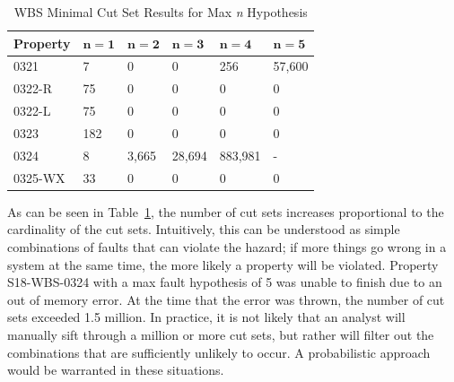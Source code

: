 \begin{table}[htbp]
\begin{center}
    \begin{tabular}{ | l | l | l | l | l | l |}
    \hline
    \textbf{Property} & $\bm{n = 1}$ & $\bm{n = 2}$ & $\bm{n = 3}$ & $\bm{n = 4}$ 
		& $\bm{n = 5}$    \\ \hline \hline
    0321 & 7 & 0 & 0 & 256 & 57,600   \\ \hline
    0322-R & 75 & 0 & 0 & 0 & 0  \\ \hline
    0322-L & 75 & 0 & 0 & 0 & 0  \\ \hline
    0323 & 182 & 0 & 0 & 0 & 0  \\ \hline
    0324 & 8 & 3,665 & 28,694 & 883,981 & - \\ \hline
    0325-WX & 33 & 0 & 0 &0 &0 \\ \hline
    \end{tabular}
    \caption{WBS Minimal Cut Set Results for Max \textit{n} Hypothesis}
    \label{tab:wbs_maxN_results}
    \end{center}
\end{table}


As can be seen in Table~\ref{tab:wbs_maxN_results}, the number of cut sets increases proportional to the cardinality of the cut sets. Intuitively, this can be understood as simple combinations of faults that can violate the hazard; if more things go wrong in a system at the same time, the more likely a property will be violated. Property S18-WBS-0324 with a max fault hypothesis of 5 was unable to finish due to an out of memory error. At the time that the error was thrown, the number of cut sets exceeded 1.5 million. In practice, it is not likely that an analyst will manually sift through a million or more cut sets, but rather will filter out the combinations that are sufficiently unlikely to occur. A probabilistic approach would be warranted in these situations. 

